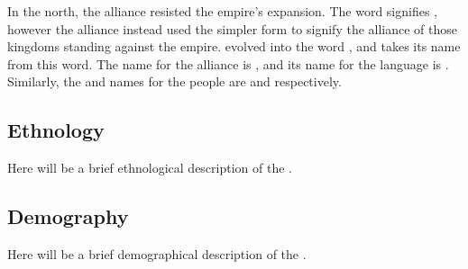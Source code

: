 In the north, the alliance resisted the empire's expansion. The \langtvk{} word   signifies , however the alliance instead used the simpler form    to signify the alliance of those kingdoms standing against the empire.  evolved into the \langrdk{} word  , and \fw{\nlangrdk}   takes its name from this word. The \langank{} name for the alliance is  , and its name for the \langrdk{} language is  . Similarly, the \langrdk{} and \langank{} names for the \langrdk{} people are \fw{\npeoprdk}  and   respectively.

\subsection{Ethnology}
\label{subsec:tvk-ethnology}

Here will be a brief ethnological description of the \peoptvk.

\subsection{Demography}
\label{subsec:tvk-demography}

Here will be a brief demographical description of the \peoptvk.